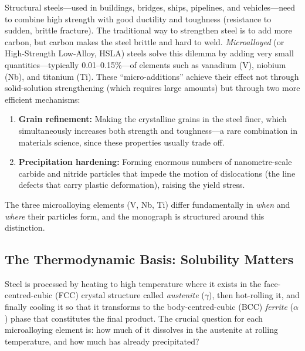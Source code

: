 \documentclass[11pt,a4paper]{article}
\begin{document}
Structural steels---used in buildings, bridges, ships, pipelines, and
vehicles---need to combine high strength with good ductility and
toughness (resistance to sudden, brittle fracture).  The traditional way
to strengthen steel is to add more carbon, but carbon makes the steel
brittle and hard to weld.  \emph{Microalloyed} (or High-Strength
Low-Alloy, HSLA) steels solve this dilemma by adding very small
quantities---typically 0.01--0.15\%---of elements such as vanadium (V),
niobium (Nb), and titanium (Ti).  These ``micro-additions'' achieve their
effect not through solid-solution strengthening (which requires large
amounts) but through two more efficient mechanisms:
\begin{enumerate}
  \item \textbf{Grain refinement:} Making the crystalline grains in the
    steel finer, which simultaneously increases both strength and
    toughness---a rare combination in materials science, since these
    properties usually trade off.
  \item \textbf{Precipitation hardening:} Forming enormous numbers of
    nanometre-scale carbide and nitride particles that impede the motion
    of dislocations (the line defects that carry plastic deformation),
    raising the yield stress.
\end{enumerate}

The three microalloying elements (V, Nb, Ti) differ fundamentally in
\emph{when} and \emph{where} their particles form, and the monograph is
structured around this distinction.

\subsection{The Thermodynamic Basis: Solubility Matters}

Steel is processed by heating to high temperature where it exists in the
face-centred-cubic (FCC) crystal structure called \emph{austenite}
($\gamma$), then hot-rolling it, and finally cooling it so that it
transforms to the body-centred-cubic (BCC) \emph{ferrite} ($\alpha$)
phase that constitutes the final product.  The crucial question for each
microalloying element is: how much of it dissolves in the austenite at
rolling temperature, and how much has already precipitated?
\end{document}

